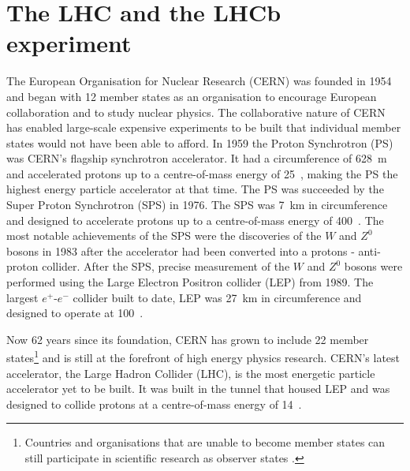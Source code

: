 \chapter{{\bf The LHC and the LHCb experiment}}
\label{CERN_LHC_LHCb}

The European Organisation for Nuclear Research (CERN) was founded in 1954 and began with 12 member states as an organisation to encourage European collaboration and to study nuclear physics. The collaborative nature of CERN has enabled large-scale expensive experiments to be built that individual member states would not have been able to afford. In 1959 the Proton Synchrotron (PS) was CERN's flagship synchrotron accelerator. It had a circumference of 628~m and accelerated protons up to a centre-of-mass energy of 25~\gev, making the PS the highest energy particle accelerator at that time. 
The PS was succeeded by the Super Proton Synchrotron (SPS) in 1976. The SPS was 7~km in circumference and designed to accelerate protons up to a centre-of-mass energy of 400~\gev. The most notable achievements of the SPS were the discoveries of the $W$ and $Z^0$ bosons in 1983 after the accelerator had been converted into a protons - anti-proton collider. After the SPS, precise measurement of the $W$ and $Z^0$ bosons were performed using the Large Electron Positron collider (LEP) from 1989. The largest $e^+$-$e^-$ collider built to date, LEP was 27~km in circumference and designed to operate at 100~\gev. 

Now 62 years since its foundation, CERN has grown to include 22 member states\footnote{Countries and organisations that are unable to become member states can still participate in scientific research as observer states \cite{Member_States}.} and is still at the forefront of high energy physics research. CERN’s latest accelerator, the Large Hadron Collider (LHC), is the most energetic particle accelerator yet to be built. It was built in the tunnel that housed LEP and was designed to collide protons at a centre-of-mass energy of 14~\tev. 

